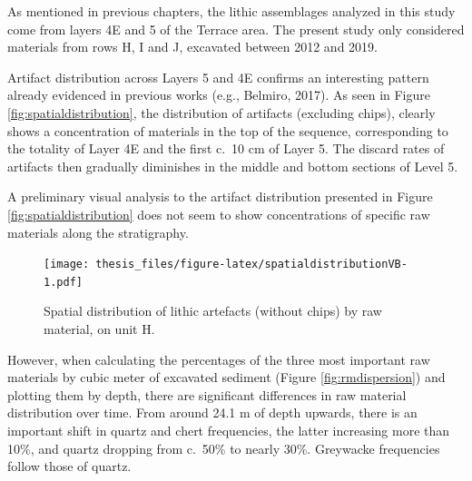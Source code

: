 \documentclass[12pt,twoside]{reedthesis}
\begin{document}
As mentioned in previous chapters, the lithic assemblages analyzed in this study come from layers 4E and 5 of the Terrace area. The present study only considered materials from rows H, I and J, excavated between 2012 and 2019.

Artifact distribution across Layers 5 and 4E confirms an interesting pattern already evidenced in previous works (e.g., Belmiro, 2017). As seen in Figure \ref{fig:spatialdistribution}, the distribution of artifacts (excluding chips), clearly shows a concentration of materials in the top of the sequence, corresponding to the totality of Layer 4E and the first c.~10 cm of Layer 5. The discard rates of artifacts then gradually diminishes in the middle and bottom sections of Level 5.

A preliminary visual analysis to the artifact distribution presented in Figure \ref{fig:spatialdistribution} does not seem to show concentrations of specific raw materials along the stratigraphy.
\begin{figure}
\centering
\texttt{[image: thesis\_files/figure-latex/spatialdistributionVB-1.pdf]}
\caption{\label{fig:spatialdistributionVB}Spatial distribution of lithic artefacts (without chips) by raw material, on unit H.}
\end{figure}
However, when calculating the percentages of the three most important raw materials by cubic meter of excavated sediment (Figure \ref{fig:rmdispersion}) and plotting them by depth, there are significant differences in raw material distribution over time. From around 24.1 m of depth upwards, there is an important shift in quartz and chert frequencies, the latter increasing more than 10\%, and quartz dropping from c.~50\% to nearly 30\%. Greywacke frequencies follow those of quartz.
\end{document}
